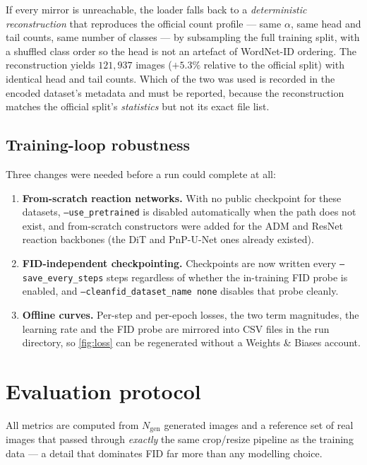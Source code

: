 \documentclass[11pt]{article}
\newcommand{\code}[1]{\texttt{\small #1}}
\begin{document}
If every mirror is unreachable, the loader falls back to a \emph{deterministic
reconstruction} that reproduces the official count profile --- same $\alpha$,
same head and tail counts, same number of classes --- by subsampling the full
training split, with a shuffled class order so the head is not an artefact of
WordNet-ID ordering. The reconstruction yields $121{,}937$ images
($+5.3\%$ relative to the official split) with identical head and tail counts.
Which of the two was used is recorded in the encoded dataset's metadata and must
be reported, because the reconstruction matches the official split's
\emph{statistics} but not its exact file list.

\subsection{Training-loop robustness}
\label{sec:trainloop}

Three changes were needed before a run could complete at all:
\begin{enumerate}\itemsep2pt
  \item \textbf{From-scratch reaction networks.} With no public checkpoint for
  these datasets, \code{--use\_pretrained} is disabled automatically when the
  path does not exist, and from-scratch constructors were added for the ADM and
  ResNet reaction backbones (the DiT and PnP-U-Net ones already existed).
  \item \textbf{FID-independent checkpointing.} Checkpoints are now written
  every \code{--save\_every\_steps} steps regardless of whether the in-training
  FID probe is enabled, and \code{--cleanfid\_dataset\_name none} disables that
  probe cleanly.
  \item \textbf{Offline curves.} Per-step and per-epoch losses, the two term
  magnitudes, the learning rate and the FID probe are mirrored into CSV files in
  the run directory, so \cref{fig:loss} can be regenerated without a Weights \&
  Biases account.
\end{enumerate}

\section{Evaluation protocol}
\label{sec:protocol}

All metrics are computed from $N_{\text{gen}}$ generated images and a reference
set of real images that passed through \emph{exactly} the same
crop/resize pipeline as the training data --- a detail that dominates FID far
more than any modelling choice.
\end{document}

